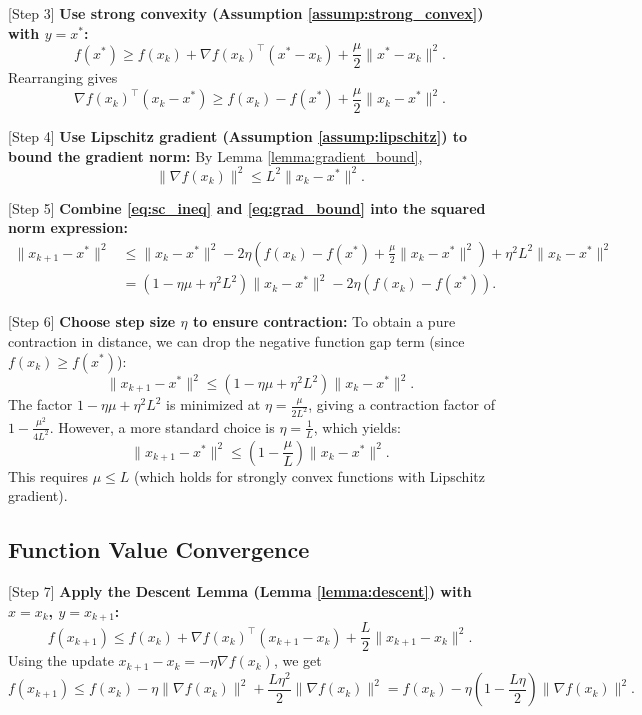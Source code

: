 \documentclass{article}
\begin{document}
[Step 3] \textbf{Use strong convexity (Assumption \ref{assump:strong_convex}) with $y = x^*$:}
\begin{equation}
    f(x^*) \ge f(x_k) + \nabla f(x_k)^\top (x^* - x_k) + \frac{\mu}{2} \|x^* - x_k\|^2.
\end{equation}
Rearranging gives
\begin{equation} \label{eq:sc_ineq}
    \nabla f(x_k)^\top (x_k - x^*) \ge f(x_k) - f(x^*) + \frac{\mu}{2} \|x_k - x^*\|^2.
\end{equation}

[Step 4] \textbf{Use Lipschitz gradient (Assumption \ref{assump:lipschitz}) to bound the gradient norm:} By Lemma \ref{lemma:gradient_bound},
\begin{equation} \label{eq:grad_bound}
    \|\nabla f(x_k)\|^2 \le L^2 \|x_k - x^*\|^2.
\end{equation}

[Step 5] \textbf{Combine \eqref{eq:sc_ineq} and \eqref{eq:grad_bound} into the squared norm expression:}
\begin{align}
    \|x_{k+1} - x^*\|^2 
    &\le \|x_k - x^*\|^2 - 2\eta \left( f(x_k) - f(x^*) + \frac{\mu}{2} \|x_k - x^*\|^2 \right) + \eta^2 L^2 \|x_k - x^*\|^2 \\
    &= (1 - \eta\mu + \eta^2 L^2) \|x_k - x^*\|^2 - 2\eta (f(x_k) - f(x^*)).
\end{align}

[Step 6] \textbf{Choose step size $\eta$ to ensure contraction:} To obtain a pure contraction in distance, we can drop the negative function gap term (since $f(x_k) \ge f(x^*)$):
\begin{equation}
    \|x_{k+1} - x^*\|^2 \le (1 - \eta\mu + \eta^2 L^2) \|x_k - x^*\|^2.
\end{equation}
The factor $1 - \eta\mu + \eta^2 L^2$ is minimized at $\eta = \frac{\mu}{2L^2}$, giving a contraction factor of $1 - \frac{\mu^2}{4L^2}$. However, a more standard choice is $\eta = \frac{1}{L}$, which yields:
\begin{equation}
    \|x_{k+1} - x^*\|^2 \le \left(1 - \frac{\mu}{L}\right) \|x_k - x^*\|^2.
\end{equation}
This requires $\mu \le L$ (which holds for strongly convex functions with Lipschitz gradient).

\subsection{Function Value Convergence}

[Step 7] \textbf{Apply the Descent Lemma (Lemma \ref{lemma:descent}) with $x = x_k$, $y = x_{k+1}$:}
\begin{equation}
    f(x_{k+1}) \le f(x_k) + \nabla f(x_k)^\top (x_{k+1} - x_k) + \frac{L}{2} \|x_{k+1} - x_k\|^2.
\end{equation}
Using the update $x_{k+1} - x_k = -\eta \nabla f(x_k)$, we get
\begin{equation}
    f(x_{k+1}) \le f(x_k) - \eta \|\nabla f(x_k)\|^2 + \frac{L\eta^2}{2} \|\nabla f(x_k)\|^2 = f(x_k) - \eta\left(1 - \frac{L\eta}{2}\right) \|\nabla f(x_k)\|^2.
\end{equation}
\end{document}
